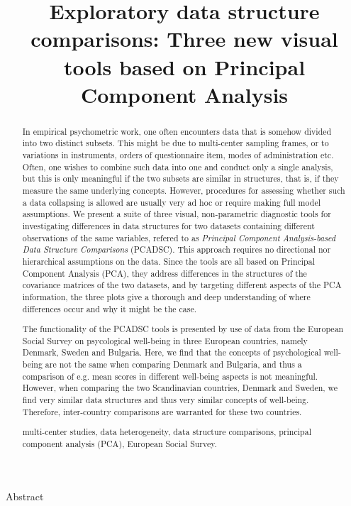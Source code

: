 \documentclass[titlepage,11pt,twoside]{article}
\begin{document}
\begin{center}\vskip3pt

\vspace{32pt}

\title{Exploratory data structure comparisons: Three new visual tools based on Principal Component Analysis}


Abstract\vskip3pt

\end{center}


\begin{abstract}

In empirical psychometric work, one often encounters data that is somehow divided into two distinct subsets. This might be due to multi-center sampling frames, or to variations in instruments, orders of questionnaire item, modes of administration etc. Often, one wishes to combine such data into one and conduct only a single analysis, but this is only meaningful if the two subsets are similar in structures, that is, if they measure the same underlying concepts. However, procedures for assessing whether such a data collapsing is allowed are usually very ad hoc or require making full model assumptions. We present a suite of three visual, non-parametric diagnostic tools for investigating differences in data structures for two datasets containing different observations of the same variables, refered to as \textit{Principal Component Analysis-based Data Structure Comparisons} (PCADSC). This approach requires no directional nor hierarchical assumptions on the data. Since the tools are all based on Principal Component Analysis (PCA), they address differences in the structures of the covariance matrices of the two datasets, and by targeting different aspects of the PCA information, the three plots give a thorough and deep understanding of where differences occur and why it might be the case.

The functionality of the PCADSC tools is presented by use of data from the European Social Survey on psycological well-being in three European countries, namely Denmark, Sweden and Bulgaria. Here, we find that the concepts of psychological well-being are not the same when comparing Denmark and Bulgaria, and thus a comparison of e.g. mean scores in different well-being aspects is not meaningful. However, when comparing the two Scandinavian countries, Denmark and Sweden, we find very similar data structures and thus very similar concepts of well-being. Therefore, inter-country comparisons are warranted for these two countries. 

\begin{keywords}
multi-center studies, data heterogeneity, data structure comparisons, principal component analysis (PCA), European Social Survey.
\end{keywords}
\end{abstract}
\end{document}
